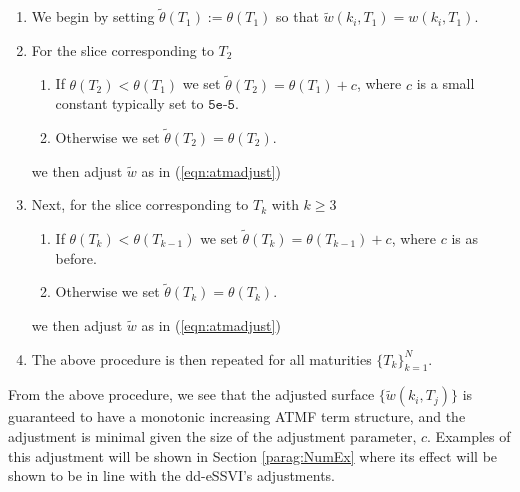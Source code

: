 \documentclass[11pt,letterpaper]{article}
\begin{document}
\begin{enumerate}
\item We begin by setting $\tilde{\theta}(T_1) := \theta(T_1)$ so that $\tilde{w}(k_i,T_1) = w(k_i,T_1)$. 
\item For the slice corresponding to $T_2$
\begin{enumerate}
\item If  $\theta(T_2) < \theta(T_1)$ we set $\tilde{\theta}(T_2) = \theta(T_1) + c $, where $c$ is a small constant typically set to $\texttt{5e-5}$. 
\item Otherwise we set $\tilde{\theta}(T_2) = \theta(T_2)$. 
\end{enumerate}
we then adjust $\tilde{w}$ as in (\ref{eqn:atmadjust})
\item Next, for the slice corresponding to $T_k$ with $k \geq 3$ 
\begin{enumerate}
\item If  $\theta(T_{k}) < \theta(T_{k-1})$ we set $\tilde{\theta}(T_{k} ) = \theta(T_{k-1}) + c $, where $c$ is as before. 
\item Otherwise we set $\tilde{\theta}(T_k) = \theta(T_k)$. 
\end{enumerate}
we then adjust $\tilde{w}$ as in (\ref{eqn:atmadjust})
\item The above procedure is then repeated for all maturities $\{ T_k \}_{k=1}^N$.
\end{enumerate}
From the above procedure, we see that the adjusted surface $\{\tilde{w}(k_i,T_j)\}$ is guaranteed to have a monotonic increasing ATMF term structure, and the adjustment is minimal given the size of the adjustment parameter, $c$. Examples of this adjustment will be shown in Section \ref{parag:NumEx} where its effect will be shown to be in line with the dd-eSSVI's adjustments. 
\end{document}
